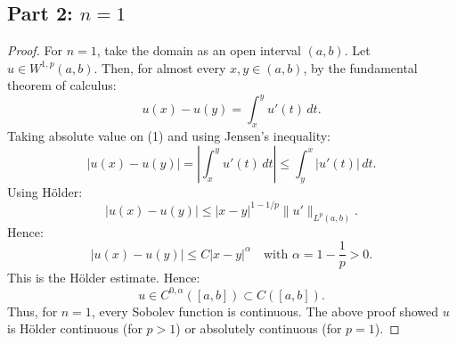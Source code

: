 \subsection{Part 2: $n=1$}
\begin{proof}
For $n=1$, take the domain as an open interval $(a,b)$. Let $u\in W^{1,p}(a,b)$. Then, for almost every $x, y\in (a,b)$, by the fundamental theorem of calculus:
\[
u(x)-u(y)=\int_x^y u'(t)\, dt.
\tag{1}
\]
Taking absolute value on (1) and using Jensen's inequality:
\[
|u(x)-u(y)|=\left|\int_x^y u'(t)\, dt\right|\le \int_y^x |u'(t)|\, dt.
\]
Using H\"older:
\[
|u(x)-u(y)| \le |x-y|^{1-1/p}\|u'\|_{L^p(a,b)}.
\]
Hence:
\[
|u(x)-u(y)| \le C|x-y|^\alpha \quad \text{with } \alpha=1-\frac{1}{p}>0.
\]
This is the H\"older estimate. Hence:
\[
u\in C^{0,\alpha}([a,b])\subset C([a,b]).
\]
Thus, for $n=1$, every Sobolev function is continuous. The above proof showed $u$ is H\"older continuous (for $p>1$) or absolutely continuous (for $p=1$).
\end{proof}

